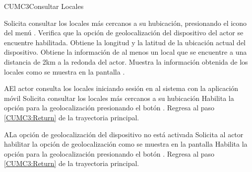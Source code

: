 \begin{UseCase}{CUMC3}{Consultar Locales}
	\end{UseCase}
	
	\begin{UCtrayectoria}
		\UCpaso[\UCactor] Solicita consultar los locales más cercanos a su hubicación, presionando el icono  del menú . 
		\UCpaso Verifica que la opción de geolocalización del dispositivo del actor se encuentre habilitada.
		\UCpaso \label{CUMC3:Return} Obtiene la longitud y la latitud de la ubicación actual del dispositivo.
		\UCpaso Obtiene la información de al menos un local que se encuentre a una distancia de 2km a la redonda del actor.
		\UCpaso \label{CUMC3:Fin}Muestra la información obtenida de los locales como se muestra en la pantalla .
	\end{UCtrayectoria}
	
		\begin{UCtrayectoriaA}{A}{El actor consulta los locales iniciando sesión en al sistema con la aplicación móvil}
		\UCpaso Solicita consultar los locales más cercanos a su hubicación 
		\UCpaso[\UCactor] Habilita la opción para la geolocalización presionando el botón .
		\UCpaso Regresa al paso \ref{CUMC3:Return} de la trayectoria principal.
	\end{UCtrayectoriaA}
	
	
	\begin{UCtrayectoriaA}{A}{La opción de geolocalización del dispositivo no está activada}
		\UCpaso Solicita al actor habilitar la opción de geolocalización como se muestra en la pantalla 
		\UCpaso[\UCactor] Habilita la opción para la geolocalización presionando el botón .
		\UCpaso Regresa al paso \ref{CUMC3:Return} de la trayectoria principal.
	\end{UCtrayectoriaA}
	
